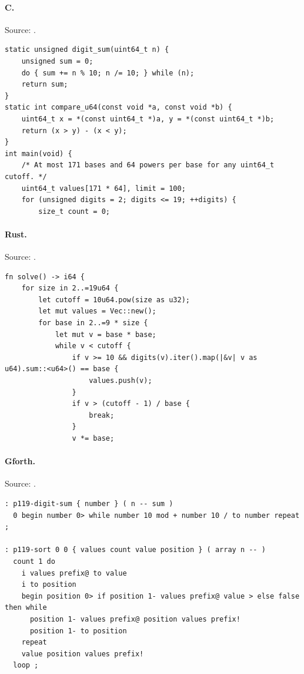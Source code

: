 \paragraph{C.} Source: .
\begin{lstlisting}
static unsigned digit_sum(uint64_t n) {
    unsigned sum = 0;
    do { sum += n % 10; n /= 10; } while (n);
    return sum;
}
static int compare_u64(const void *a, const void *b) {
    uint64_t x = *(const uint64_t *)a, y = *(const uint64_t *)b;
    return (x > y) - (x < y);
}
int main(void) {
    /* At most 171 bases and 64 powers per base for any uint64_t cutoff. */
    uint64_t values[171 * 64], limit = 100;
    for (unsigned digits = 2; digits <= 19; ++digits) {
        size_t count = 0;
\end{lstlisting}

\paragraph{Rust.} Source: .
\begin{lstlisting}
fn solve() -> i64 {
    for size in 2..=19u64 {
        let cutoff = 10u64.pow(size as u32);
        let mut values = Vec::new();
        for base in 2..=9 * size {
            let mut v = base * base;
            while v < cutoff {
                if v >= 10 && digits(v).iter().map(|&v| v as u64).sum::<u64>() == base {
                    values.push(v);
                }
                if v > (cutoff - 1) / base {
                    break;
                }
                v *= base;
\end{lstlisting}

\paragraph{Gforth.} Source: .
\begin{lstlisting}
: p119-digit-sum { number } ( n -- sum )
  0 begin number 0> while number 10 mod + number 10 / to number repeat ;

: p119-sort 0 0 { values count value position } ( array n -- )
  count 1 do
    i values prefix@ to value
    i to position
    begin position 0> if position 1- values prefix@ value > else false then while
      position 1- values prefix@ position values prefix!
      position 1- to position
    repeat
    value position values prefix!
  loop ;
\end{lstlisting}

